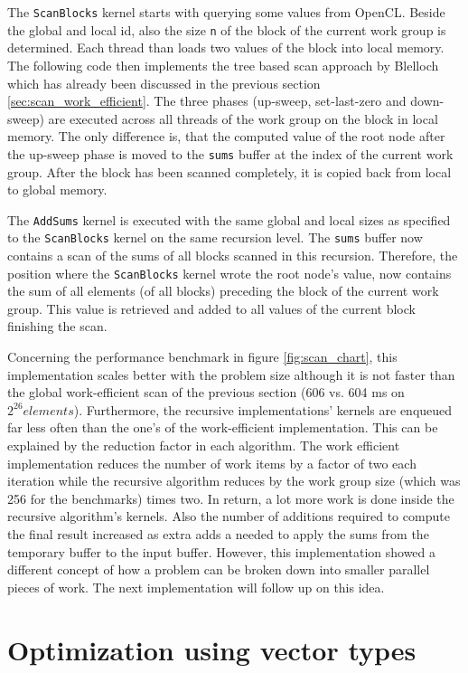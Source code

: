 The \lstinline!ScanBlocks! kernel starts with querying some values from OpenCL. Beside the global and local id, also the size \lstinline!n! of the block of the current work group is determined. Each thread than loads two values of the block into local memory. The following code then implements the tree based scan approach by Blelloch which has already been discussed in the previous section \ref{sec:scan_work_efficient}. The three phases (up-sweep, set-last-zero and down-sweep) are executed across all threads of the work group on the block in local memory. The only difference is, that the computed value of the root node after the up-sweep phase is moved to the \lstinline!sums! buffer at the index of the current work group. After the block has been scanned completely, it is copied back from local to global memory.

The \lstinline!AddSums! kernel is executed with the same global and local sizes as specified to the \lstinline!ScanBlocks! kernel on the same recursion level. The \lstinline!sums! buffer now contains a scan of the sums of all blocks scanned in this recursion. Therefore, the position where the \lstinline!ScanBlocks! kernel wrote the root node's value, now contains the sum of all elements (of all blocks) preceding the block of the current work group. This value is retrieved and added to all values of the current block finishing the scan.

Concerning the performance benchmark in figure \ref{fig:scan_chart}, this implementation scales better with the problem size although it is not faster than the global work-efficient scan of the previous section (606 vs. 604 ms on $2^{26} elements$). Furthermore, the recursive implementations' kernels are enqueued far less often than the one's of the work-efficient implementation. This can be explained by the reduction factor in each algorithm. The work efficient implementation reduces the number of work items by a factor of two each iteration while the recursive algorithm reduces by the work group size (which was 256 for the benchmarks) times two. In return, a lot more work is done inside the recursive algorithm's kernels. Also the number of additions required to compute the final result increased as extra adds a needed to apply the sums from the temporary buffer to the input buffer.
However, this implementation showed a different concept of how a problem can be broken down into smaller parallel pieces of work. The next implementation will follow up on this idea.

\section{Optimization using vector types}
\label{sec:scan_vector}

